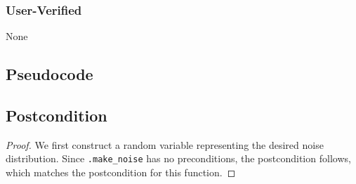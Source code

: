 \documentclass{article}
\begin{document}
\subsubsection*{User-Verified}
None

\subsection*{Pseudocode}


\subsection*{Postcondition}
\begin{theorem}
\end{theorem}

\begin{proof}
    We first construct a random variable  representing the desired noise distribution.
    Since \texttt{.make\_noise} has no preconditions,
    the postcondition follows, which matches the postcondition for this function.
\end{proof}
\end{document}
